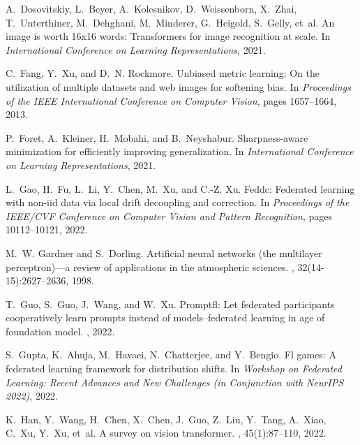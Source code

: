 \documentclass[11pt]{article}
\begin{document}
\begin{thebibliography}{10}
A.~Dosovitskiy, L.~Beyer, A.~Kolesnikov, D.~Weissenborn, X.~Zhai,
  T.~Unterthiner, M.~Dehghani, M.~Minderer, G.~Heigold, S.~Gelly, et~al.
\newblock An image is worth 16x16 words: Transformers for image recognition at
  scale.
\newblock In {\em International Conference on Learning Representations}, 2021.

C.~Fang, Y.~Xu, and D.~N. Rockmore.
\newblock Unbiased metric learning: On the utilization of multiple datasets and
  web images for softening bias.
\newblock In {\em Proceedings of the IEEE International Conference on Computer
  Vision}, pages 1657--1664, 2013.

P.~Foret, A.~Kleiner, H.~Mobahi, and B.~Neyshabur.
\newblock Sharpness-aware minimization for efficiently improving
  generalization.
\newblock In {\em International Conference on Learning Representations}, 2021.

L.~Gao, H.~Fu, L.~Li, Y.~Chen, M.~Xu, and C.-Z. Xu.
\newblock Feddc: Federated learning with non-iid data via local drift
  decoupling and correction.
\newblock In {\em Proceedings of the IEEE/CVF Conference on Computer Vision and
  Pattern Recognition}, pages 10112--10121, 2022.

M.~W. Gardner and S.~Dorling.
\newblock Artificial neural networks (the multilayer perceptron)—a review of
  applications in the atmospheric sciences.
, 32(14-15):2627--2636, 1998.

T.~Guo, S.~Guo, J.~Wang, and W.~Xu.
\newblock Promptfl: Let federated participants cooperatively learn prompts
  instead of models--federated learning in age of foundation model.
, 2022.

S.~Gupta, K.~Ahuja, M.~Havaei, N.~Chatterjee, and Y.~Bengio.
\newblock Fl games: A federated learning framework for distribution shifts.
\newblock In {\em Workshop on Federated Learning: Recent Advances and New
  Challenges (in Conjunction with NeurIPS 2022)}, 2022.

K.~Han, Y.~Wang, H.~Chen, X.~Chen, J.~Guo, Z.~Liu, Y.~Tang, A.~Xiao, C.~Xu,
  Y.~Xu, et~al.
\newblock A survey on vision transformer.
,
  45(1):87--110, 2022.


\end{thebibliography}
\end{document}
